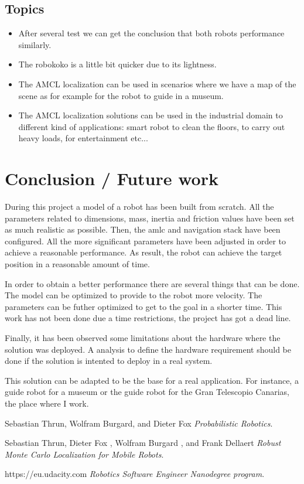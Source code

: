\documentclass[10pt,journal,compsoc]{IEEEtran}
\begin{document}
\subsection{Topics}

\begin{itemize}
\item After several test we can get the conclusion that both robots performance similarly.
\item The robokoko is a little bit quicker due to its lightness.
\item The AMCL localization can be used in scenarios where we have a map of the scene as for example for the robot to guide in a museum.
\item The AMCL localization solutions can be used in the industrial domain to different kind of applications: smart robot to clean the floors, to carry out heavy loads, for entertainment etc...
\end{itemize}

\section{Conclusion / Future work}


During this project a model of a robot has been built from scratch. All the parameters related to dimensions, mass, inertia and friction values have been set as much realistic as possible. Then, the amlc and navigation stack have been configured. All the more significant parameters have been adjusted in order to achieve a reasonable performance. As result, the robot can achieve the target position in a reasonable amount of time. 

In order to obtain a better performance there are several things that can be done. The model can be optimized to provide to the robot more velocity. The parameters can be futher optimized to get to the goal in a shorter time. This work has not been done due a time restrictions, the project has got a dead line.

Finally, it has been observed some limitations about the hardware where the solution was deployed. A analysis to define the hardware requirement should be done if the solution is intented to deploy in a real system.

This solution can be adapted to be the base for a real application. For instance, a guide robot for a museum or the guide robot for the Gran Telescopio Canarias, the place where I work.

\begin{thebibliography}{9}


Sebastian Thrun, Wolfram Burgard, and Dieter Fox
\textit{Probabilistic Robotics}. 

Sebastian Thrun, Dieter Fox , Wolfram Burgard , and Frank Dellaert
\textit{Robust Monte Carlo Localization for Mobile Robots}. 

https://eu.udacity.com
\textit{Robotics Software Engineer Nanodegree program}. 

\end{thebibliography}
\end{document}
